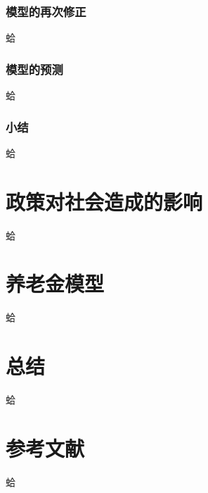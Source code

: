\documentclass[11pt]{article}
\begin{document}
	\section{模型的再次修正}
		蛤
	\section{模型的预测}
		蛤
	\section{小结}
		蛤
	
\part{政策对社会造成的影响}
	蛤

\part{养老金模型}
	蛤

\part{总结}
	蛤

\part*{参考文献}
	蛤
\end{document}
